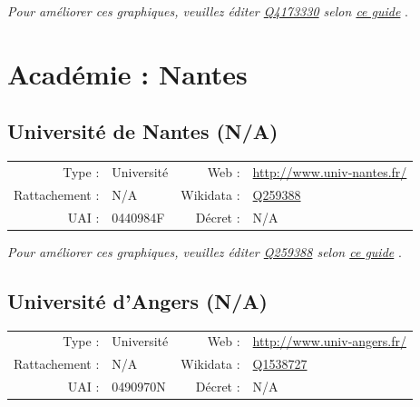 \documentclass[12pt,french,landscape]{article}
\begin{document}
\textit{\scriptsize Pour améliorer ces graphiques, veuillez éditer \href{https://www.wikidata.org/entity/Q4173330}{Q4173330}  selon \href{https://github.com/cpesr/wikidataESR/blob/master/Rmd/wikidataESR.md}{ce guide}}
.


\newpage

\hypertarget{acaduxe9mie-nantes}{%
\section{Académie : Nantes}\label{acaduxe9mie-nantes}}

\hypertarget{universituxe9-de-nantes-na}{%
\subsection{Université de Nantes
(N/A)}\label{universituxe9-de-nantes-na}}

\begin{tabular*}{0.45\textwidth}{rp{2cm}rl}  
\hline  
Type : & Université & Web : &\href{http://www.univ-nantes.fr/}{http://www.univ-nantes.fr/} \\  
Rattachement : & N/A & Wikidata : & \href{https://www.wikidata.org/entity/Q259388}{Q259388} \\  
UAI : & 0440984F & Décret : & N/A \\  
\hline  
\end{tabular*}

\textit{\scriptsize Pour améliorer ces graphiques, veuillez éditer \href{https://www.wikidata.org/entity/Q259388}{Q259388}  selon \href{https://github.com/cpesr/wikidataESR/blob/master/Rmd/wikidataESR.md}{ce guide}}
.


\newpage

\hypertarget{universituxe9-dangers-na}{%
\subsection{Université d'Angers (N/A)}\label{universituxe9-dangers-na}}

\begin{tabular*}{0.45\textwidth}{rp{2cm}rl}  
\hline  
Type : & Université & Web : &\href{http://www.univ-angers.fr/}{http://www.univ-angers.fr/} \\  
Rattachement : & N/A & Wikidata : & \href{https://www.wikidata.org/entity/Q1538727}{Q1538727} \\  
UAI : & 0490970N & Décret : & N/A \\  
\hline  
\end{tabular*}
\end{document}
